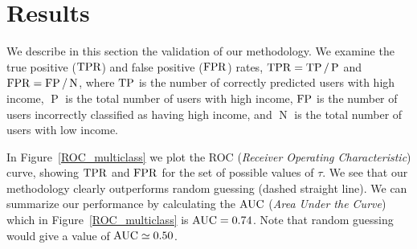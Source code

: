 \section{Results}





We describe in this section the validation of our methodology.
We examine the true positive ($\operatorname{TPR}$) and false positive ($\operatorname{FPR}$) rates, \( \operatorname{TPR} = \operatorname{TP} / \operatorname{P} \) and \( \operatorname{FPR} = \operatorname{FP} / \operatorname{N} \), where $\operatorname{TP}$ is the number of correctly predicted users with high income, $\operatorname{P}$ is the total number of users with high income, $\operatorname{FP}$ is the number of users incorrectly classified as having high income, and $\operatorname{N}$ is the total number of users with low income.

In Figure~\ref{ROC_multiclass} we plot the ROC (\textit{Receiver Operating Characteristic}) curve, showing $\operatorname{TPR}$ and $\operatorname{FPR}$ for the set of possible values of $\tau$. We see that our methodology clearly outperforms random guessing (dashed straight line). We can summarize our performance by calculating  the $\operatorname{AUC}$ (\textit{Area Under the Curve}) which in Figure~\ref{ROC_multiclass} is $\operatorname{AUC} = 0.74$. Note that random guessing would give a value of $\operatorname{AUC} \simeq 0.50$.


